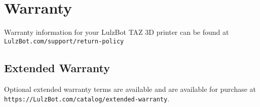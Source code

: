 %
%
%
%
%

\section{Warranty}
Warranty information for your LulzBot\textsuperscript{\miniscule{\texttrademark}} TAZ 3D printer can be found at \texttt{LulzBot.com/support/return-policy}

\subsection{Extended Warranty}
Optional extended warranty terms are available and are available for purchase at \texttt{https://LulzBot.com/catalog/extended-warranty}.
